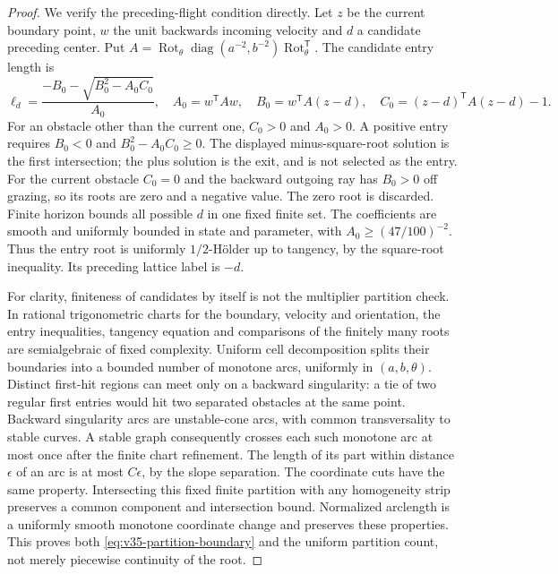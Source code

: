 \begin{proof}
We verify the preceding-flight condition directly. Let $z$ be the
current boundary point, $w$ the unit backwards incoming velocity and
$d$ a candidate preceding center. Put
$A=\operatorname{Rot}_\theta\operatorname{diag}(a^{-2},b^{-2})
\operatorname{Rot}_\theta^{\mathsf T}$. The candidate entry length is
\begin{equation}\label{eq:v35-ellipse-entry-root}
 \ell_d=\frac{-B_0-\sqrt{B_0^2-A_0C_0}}{A_0},\quad
 A_0=w^{\mathsf T}Aw,\quad B_0=w^{\mathsf T}A(z-d),\quad
 C_0=(z-d)^{\mathsf T}A(z-d)-1.
\end{equation}
For an obstacle other than the current one, $C_0>0$ and $A_0>0$.
A positive entry requires $B_0<0$ and $B_0^2-A_0C_0\ge0$.
The displayed minus-square-root solution is the first intersection;
the plus solution is the exit, and is not selected as the entry.
For the current obstacle $C_0=0$ and the backward outgoing ray has
$B_0>0$ off grazing, so its roots are zero and a negative value.
The zero root is discarded. Finite horizon
bounds all possible $d$ in one fixed finite set. The coefficients are
smooth and uniformly bounded in state and parameter, with
$A_0\ge(47/100)^{-2}$. Thus the entry root is uniformly $1/2$-H\"older
up to tangency, by the square-root inequality. Its preceding lattice
label is $-d$.

For clarity, finiteness of candidates by itself is not the multiplier
partition check. In rational trigonometric charts for the boundary,
velocity and orientation, the entry inequalities, tangency equation
and comparisons of the finitely many roots are semialgebraic of fixed
complexity. Uniform cell decomposition splits their boundaries into
a bounded number of monotone arcs, uniformly in $(a,b,\theta)$.
Distinct first-hit regions can meet only on a backward singularity:
a tie of two regular first entries would hit two separated obstacles
at the same point. Backward singularity arcs are unstable-cone arcs,
with common transversality to stable curves. A stable graph consequently
crosses each such monotone arc at most once after the finite chart
refinement. The length of its part within distance $\epsilon$ of an
arc is at most $C\epsilon$, by the slope separation. The coordinate
cuts have the same property. Intersecting this fixed finite partition
with any homogeneity strip preserves a common component and
intersection bound. Normalized arclength is a uniformly smooth
monotone coordinate change and preserves these properties. This proves
both \eqref{eq:v35-partition-boundary} and the uniform partition count,
not merely piecewise continuity of the root.


\end{proof}
